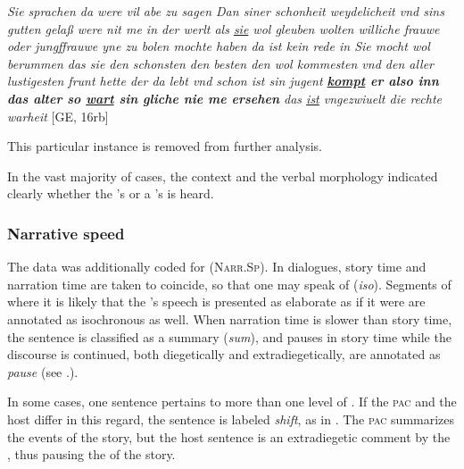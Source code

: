 \documentclass[output=paper,colorlinks,citecolor=brown]{langscibook}
\begin{document}
\ea \label{ex:IS?}
{\itshape Sie sprachen da were vil abe zu sagen Dan siner schonheit weydelicheit vnd sins gutten gela\ss{} were nit me in der werlt
 als \uline{sie} wol gleuben wolten williche frauwe oder jungffrauwe yne zu bolen mochte haben da ist kein rede in Sie mocht wol berummen das sie den schonsten den besten den wol kommesten vnd den aller lustigesten frunt hette der da lebt vnd schon ist sin jugent \textbf{\uline{kompt} er also inn das alter so \uline{wart} sin gliche nie me ersehen} das \uline{ist} vngezwiuelt die rechte warheit }\hfill [GE, 16rb]
\z

\noindent This particular instance is removed from further analysis.

In the vast majority of cases, the context and the verbal morphology indicated clearly whether the 's or a 's  is heard.


\subsubsection{Narrative speed}\label{sec:3.3.2}
The data was additionally coded for  (\textsc{Narr.Sp}). In dialogues, story time and narration time are taken to coincide, so that one may speak of  (\textit{iso}). Segments of  where it is likely that the 's speech is presented as elaborate as if it were  are annotated as isochronous as well. When narration time is slower than story time, the sentence is classified as a summary (\textit{sum}), and pauses in story time while the discourse is continued, both diegetically and extradiegetically, are annotated as \textit{pause} (see .).

In some cases, one sentence pertains to more than one level of . If the \textsc{pac} and the host differ in this regard, the sentence is labeled \textit{shift}, as in . The \textsc{pac} summarizes the events of the story, but the host sentence is an extradiegetic comment by the , thus pausing the  of the story.
\end{document}
